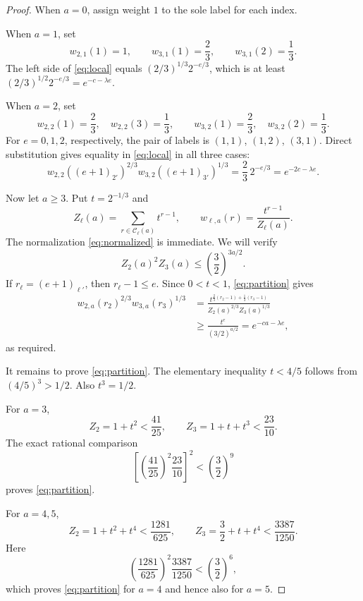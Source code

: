 \documentclass[11pt,a4paper]{article}
\theoremstyle{remark}
\newcommand{\CC}{\mathcal C}
\begin{document}
\begin{proof}
When $a=0$, assign weight $1$ to the sole label for each index.

When $a=1$, set
\[
w_{2,1}(1)=1,\qquad w_{3,1}(1)=\frac23,\qquad w_{3,1}(2)=\frac13.
\]
The left side of \eqref{eq:local} equals $(2/3)^{1/3}2^{-e/3}$, which is at least $(2/3)^{1/2}2^{-e/3}=e^{-c-\lambda e}$.

When $a=2$, set
\[
w_{2,2}(1)=\frac23,\quad w_{2,2}(3)=\frac13,
\qquad
w_{3,2}(1)=\frac23,\quad w_{3,2}(2)=\frac13.
\]
For $e=0,1,2$, respectively, the pair of labels is $(1,1)$, $(1,2)$, $(3,1)$. Direct substitution gives equality in \eqref{eq:local} in all three cases:
\[
w_{2,2}((e+1)_{2'})^{2/3}w_{3,2}((e+1)_{3'})^{1/3}
=\frac23\,2^{-e/3}=e^{-2c-\lambda e}.
\]

Now let $a\ge3$. Put $t=2^{-1/3}$ and
\[
Z_\ell(a)=\sum_{r\in\CC_\ell(a)}t^{r-1},\qquad
w_{\ell,a}(r)=\frac{t^{r-1}}{Z_\ell(a)}.
\]
The normalization \eqref{eq:normalized} is immediate. We will verify
\begin{equation}\label{eq:partition}
Z_2(a)^2Z_3(a)\le\left(\frac32\right)^{3a/2}.
\end{equation}
If $r_\ell=(e+1)_{\ell'}$, then $r_\ell-1\le e$. Since $0<t<1$, \eqref{eq:partition} gives
\begin{align*}
w_{2,a}(r_2)^{2/3}w_{3,a}(r_3)^{1/3}
&=\frac{t^{\frac23(r_2-1)+\frac13(r_3-1)}}{Z_2(a)^{2/3}Z_3(a)^{1/3}}\\
&\ge\frac{t^e}{(3/2)^{a/2}}
=e^{-ca-\lambda e},
\end{align*}
as required.

It remains to prove \eqref{eq:partition}. The elementary inequality $t<4/5$ follows from $(4/5)^3>1/2$. Also $t^3=1/2$.

For $a=3$,
\[
Z_2=1+t^2<\frac{41}{25},\qquad
Z_3=1+t+t^3<\frac{23}{10}.
\]
The exact rational comparison
\begin{equation}\label{eq:check3}
\left[\left(\frac{41}{25}\right)^2\frac{23}{10}\right]^2
<\left(\frac32\right)^9
\end{equation}
proves \eqref{eq:partition}.

For $a=4,5$,
\[
Z_2=1+t^2+t^4<\frac{1281}{625},\qquad
Z_3=\frac32+t+t^4<\frac{3387}{1250}.
\]
Here
\begin{equation}\label{eq:check45}
\left(\frac{1281}{625}\right)^2\frac{3387}{1250}
<\left(\frac32\right)^6,
\end{equation}
which proves \eqref{eq:partition} for $a=4$ and hence also for $a=5$.


\end{proof}
\end{document}
